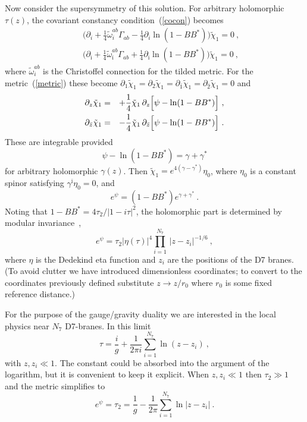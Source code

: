 \documentclass[a4paper,12pt]{article}
\renewcommand{\i}{\imath}
\newcommand{\bi}{{\bar\i}}
\renewcommand{\=}[1]{\bar{#1}}
\begin{document}
Now consider the supersymmetry of this solution.  For arbitrary holomorphic
$\tau(z)$, the covariant constancy condition~(\ref{cocon}) becomes
\begin{eqnarray}
&&\biggl(\partial_{i} +
\frac{1}{4} \tilde{\omega}_{i} ^{ab}
\Gamma_{ab}-\frac{1}{4}\partial_{i} \ln(1-BB^*)\biggr)\tilde{\chi}_1=0\ ,
\nonumber\\
&&\biggl(\partial_{\bi} +
\frac{1}{4} \tilde{\omega}_{\bi} ^{ab}
\Gamma_{ab}+\frac{1}{4}\partial_{\bi} \ln(1-BB^*)\biggr)\tilde{\chi}_1=0\ ,
\label{susyvar}
\end{eqnarray}
where $\tilde{\omega}_{i} ^{ab}$ is the Christoffel connection for the tilded
metric.  For the metric~(\ref{metric}) these become $\partial_{1}
\tilde{\chi}_1=\partial_{2}
\tilde{\chi}_1=\partial_{\bar 1}
\tilde{\chi}_1=\partial_{\bar 2}
\tilde{\chi}_1= 0$
and
\begin{eqnarray}
\partial_{z} \tilde{\chi}_1 &=& +
\frac{1}{4} \tilde{\chi}_1\, \partial_{z}\Bigl[\psi-\ln(1-BB^*)\Bigr]\ ,
\nonumber\\
\partial_{\bar z} \tilde{\chi}_1 &=&
-\frac{1}{4} \tilde{\chi}_1\, \partial_{\bar z}\Bigl[\psi-\ln(1-BB^*)\Bigr]
\ .
\end{eqnarray}
These are integrable provided
\begin{equation}
\psi-\ln(1-BB^*) = \gamma + \gamma^*
\end{equation}
for arbitrary holomorphic $\gamma(z)$.  Then $\tilde{\chi}_1 = e^{4(\gamma -
\gamma^*)}
\eta_0$, where $\eta_0$ is a constant spinor satisfying
$\gamma^{\bar\imath} \eta_0
= 0$, and
\begin{equation}
e^{\psi}= (1-BB^*)e^{\gamma + \gamma^*} \ .
\label{psi}
\end{equation}
Noting that
$1-BB^*={4\tau_2}/{|1-i \tau|^2}$, the holomorphic part is determined by modular
invariance~\cite{stringycstrings},
\begin{equation}
e^{\psi}= \tau_2 |\eta(\tau)|^4
\prod_{i=1}^{N_7} \, | {z-z_i} |^{-1/6}\ ,
\label{psimod}
\end{equation}
where $\eta$ is the Dedekind eta function and $z_i$ are the positions
of the D7 branes.  (To avoid clutter we have introduced dimensionless
coordinates; to convert to the coordinates previously defined substitute $z \to
z/r_0$ where
$r_0$ is some fixed reference distance.)

For the purpose of the gauge/gravity duality we are interested in the local
physics
near $N_7$ D7-branes.  In this limit
\begin{equation}
\tau = \frac{i}{g} + \frac{1}{2\pi i} \sum_{i=1}^{N_7} \ln(z-z_i)
\label{dtau} \
,
\end{equation}
with $z, z_i \ll 1$.  The constant could be absorbed into the argument of the
logarithm, but it is convenient to keep it explicit.
When $z, z_i \ll 1$ then $\tau_2 \gg 1$ and the metric simplifies to
\begin{equation}
e^{\psi} = \tau_2 = \frac{1}{g} - \frac{1}{2\pi} \sum_{i=1}^{N_7} \ln|z-z_i| \
.
\label{dpsi}
\end{equation}
\end{document}
